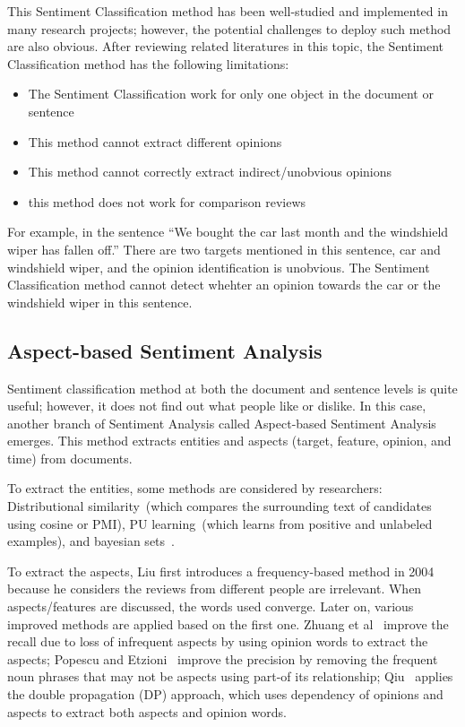 \documentclass[12pt]{article}
\begin{document}
\begin{itemize}
This Sentiment Classification method has been well-studied and implemented in many research projects; however, the potential challenges to deploy such method are also obvious. After reviewing related literatures in this topic, the Sentiment Classification method has the following limitations:
\begin{itemize}
\item The Sentiment Classification work for only one object in the document or sentence
\item This method cannot extract different opinions
\item This method cannot correctly extract indirect/unobvious opinions
\item this method does not work for comparison reviews
\end{itemize}
For example, in the sentence ``We bought the car last month and the windshield wiper has fallen off.'' There are two targets mentioned in this sentence, car and windshield wiper, and the opinion identification is unobvious. The Sentiment Classification method cannot detect whehter an opinion towards the car or the windshield wiper in this sentence.
\end{itemize}

\subsection{Aspect-based Sentiment Analysis}
Sentiment classification method at both the document and sentence levels is quite useful; however, it does not find out what people like or dislike. In this case, another branch of Sentiment Analysis called Aspect-based Sentiment Analysis emerges. This method extracts entities and aspects (target, feature, opinion, and time) from documents.

To extract the entities, some methods are considered by researchers: Distributional similarity~\cite{jo2011aspect}(which compares the surrounding text of candidates using cosine or PMI), PU learning~\cite{liu2002partially}(which learns from positive and unlabeled examples), and bayesian sets~\cite{heller2005bayesian}.

To extract the aspects, Liu first introduces a frequency-based method in 2004~\cite{hu2004mining} because he considers the reviews from different people are irrelevant. When aspects/features are discussed, the words used converge. Later on, various improved methods are applied based on the first one. Zhuang et al~\cite{zhuang2006movie} improve the recall due to loss of infrequent aspects by using opinion words to extract the aspects; Popescu and Etzioni~\cite{popescu2005opine} improve the precision by removing the frequent noun phrases that may not be aspects using part-of its relationship; Qiu~\cite{qiu2011opinion} applies the double propagation (DP) approach, which uses dependency of opinions and aspects to extract both aspects and opinion words. 
\end{document}
